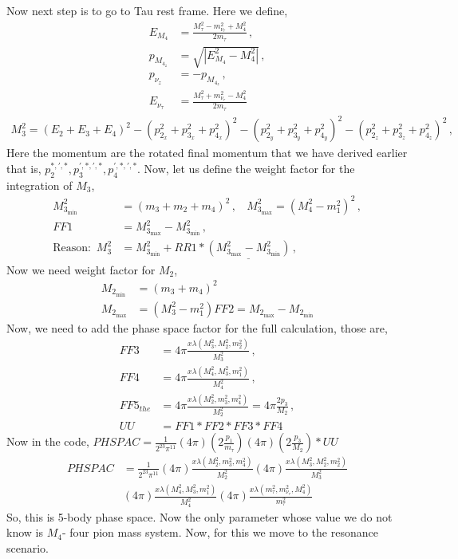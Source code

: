 \documentclass[12pt]{article}
\begin{document}
{{ Now next step is to go to Tau rest frame. Here we define,
 \begin{align}
     E_{M_4} &= \frac{M_\tau^2 - m_{\nu_\tau}^2 + M_4^2}{2 m_\tau} \,, \\
     p_{M_{4_z}} &= \sqrt{|E_{M_4}^2 - M_4^2|} \,, \\
     p_{\nu_z} &= - p_{M_{4_z}} \,,
    \\
     E_{\nu_\tau} &=  \frac{M_\tau^2 + m_{\nu_\tau}^2 - M_4^2}{2 m_\tau}
 \end{align}
\begin{align}
    M_3^2 = (E_2 + E_3 + E_4)^2 - (p_{2_x}^{2} +  p_{3_x}^{2} + p_{4_x}^{2})^2 -  (p_{2_y}^{2} +  p_{3_y}^{2} + p_{4_y}^{2})^2 - (p_{2_z}^{2} +  p_{3_z}^{2} + p_{4_z}^{2})^2 \,,
\end{align}
Here the momentum are the rotated final momentum that we have derived earlier that is, $p_2^{*,\prime,*}, p_{3}^{\prime,*,\prime,*}, p_4^{\prime,*,\prime,*}$.
Now, let us define the weight factor for the integration of $M_3$,
\begin{align}
    M_{3_\text{min}}^2 &= (m_3+m_2+m_4)^2 \,, ~~~~ M_{3_{\text{max}}}^2 = ( M_4^2 - m_1^2)^2 \,,\\
    FF1 &= M_{3_{\text{max}}}^2 -  M_{3_\text{min}}^2 \,, \\
    \text{Reason:} \,\,\, M_3^2 &=  M_{3_{\text{min}}}^2 + RR1 * \underline{( M_{3_{\text{max}}}^2 -  M_{3_{\text{min}}}^2)} \,,
\end{align}
Now we need weight factor for $M_2$, \\
\begin{align}
    M_{2_{\text{min}}} &= (m_3 + m_4)^2 \\
    M_{2_{\text{max}}} & = (M_3^2 - m_1^2)
    FF2 = M_{2_{\text{max}}} -  M_{2_{\text{min}}}
\end{align}
Now, we need to add the phase space factor for the full calculation, those are,
\begin{align}
    FF3 &= 4 \pi \frac{x\lambda(M_3^2, M_2^2, m_2^2)}{M_3^2} \,,\\
    FF4 &= 4 \pi \frac{x\lambda(M_4^2, M_3^2, m_1^2)}{M_4^2} \,, \\
    FF5_{the} &= 4 \pi \frac{x\lambda(M_2^2, m_3^2, m_4^2)}{M_2^2} = 4 \pi \frac{2 p_3}{M_2} \,,\\
    UU &= FF1 * FF2 * FF3 *FF4
\end{align}
  Now in the code, $PHSPAC = \frac{1}{2^{23} \pi^{11}} (4 \pi) (2 \frac{p_1}{m_\tau}) (4 \pi) (2 \frac{p_3}{M_2}) *UU $
  \begin{align}
      PHSPAC &= \frac{1}{2^{23} \pi^{11}} (4 \pi)  \frac{x\lambda(M_2^2, m_3^2, m_4^2)}{M_2^2} (4 \pi) \frac{x\lambda(M_3^2, M_2^2, m_2^2)}{M_3^2} \nonumber \\
      &(4 \pi) \frac{x\lambda(M_4^2, M_3^2, m_1^2)}{M_4^2} (4 \pi) \frac{x\lambda(m_\tau^2, m_{\nu_\tau}^2, M_4^2)}{m_\tau^2}
  \end{align}
  So, this is 5-body phase space. Now the only parameter whose value we do not know is $M_4$- four pion mass system. Now, for this we move to the resonance scenario.

}}
\end{document}
